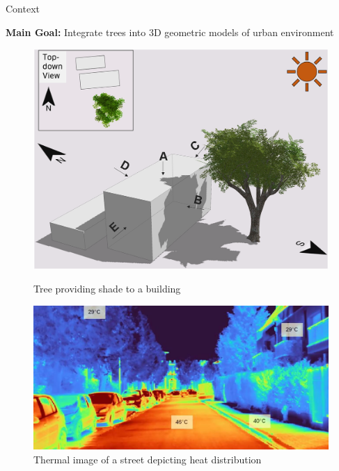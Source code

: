 \documentclass[10pt]{beamer}
\begin{document}
\begin{frame}{Context}
  
\textbf{Main Goal:} Integrate trees into 3D geometric models of urban environment
  
  \begin{figure}[H]
      \begin{minipage}{0.45\textwidth}
          \centering
          \includegraphics[width=1\textwidth]{images/TreeShade.png}
          \caption{Tree providing shade to a building}
      \end{minipage}
      \begin{minipage}{0.45\textwidth}
          \centering
          \includegraphics[width=1\textwidth]{images/heat_street.png}
          \caption{Thermal image of a street depicting heat distribution}
      \end{minipage}
  \end{figure}
\end{frame}
\end{document}
